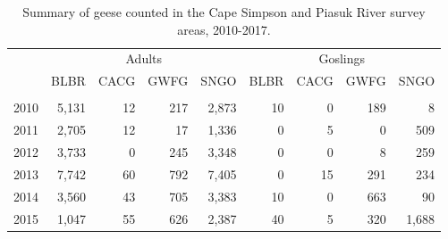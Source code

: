 \documentclass[]{article}
\begin{document}
\makeatletter
\setlength{\@fptop}{0pt} \makeatother

\begin{table}

\caption{\label{tab:Kable_Table3_output}Summary of geese counted in the Cape Simpson and Piasuk River survey areas, 2010-2017.}
\centering
\begin{tabular}[t]{lrrrrrrrr}
\toprule
\multicolumn{1}{c}{} & \multicolumn{4}{c}{Adults} & \multicolumn{4}{c}{Goslings} \\
\cmidrule(l{2pt}r{2pt}){2-5} \cmidrule(l{2pt}r{2pt}){6-9}
 & BLBR & CACG & GWFG & SNGO & BLBR & CACG & GWFG & SNGO\\
\midrule
\addlinespace[0.3em]
\multicolumn{9}{l}{\textbf{Piasuk River}}\\
\hspace{1em}\hspace{1em}\hspace{1em}\hspace{1em}2010 & 5,131 & 12 & 217 & 2,873 & 10 & 0 & 189 & 8\\
\hspace{1em}\hspace{1em}\hspace{1em}\hspace{1em}2011 & 2,705 & 12 & 17 & 1,336 & 0 & 5 & 0 & 509\\
\hspace{1em}\hspace{1em}\hspace{1em}\hspace{1em}2012 & 3,733 & 0 & 245 & 3,348 & 0 & 0 & 8 & 259\\
\hspace{1em}\hspace{1em}\hspace{1em}\hspace{1em}2013 & 7,742 & 60 & 792 & 7,405 & 0 & 15 & 291 & 234\\
\hspace{1em}\hspace{1em}\hspace{1em}\hspace{1em}2014 & 3,560 & 43 & 705 & 3,383 & 10 & 0 & 663 & 90\\
\hspace{1em}\hspace{1em}\hspace{1em}\hspace{1em}2015 & 1,047 & 55 & 626 & 2,387 & 40 & 5 & 320 & 1,688\\

\end{tabular}
\end{table}
\end{document}
